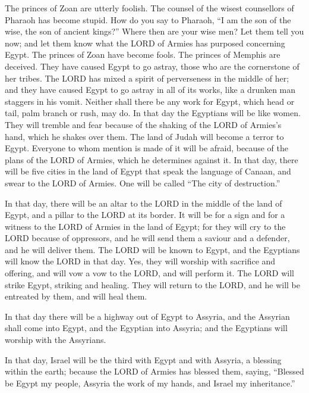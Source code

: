  The princes of Zoan are utterly foolish. The counsel of
the wisest counsellors of Pharaoh has become stupid. How do you say to
Pharaoh, ``I am the son of the wise, the son of ancient kings?''
 Where then are your wise men? Let them tell you now; and
let them know what the LORD of Armies has purposed concerning Egypt.
 The princes of Zoan have become fools. The princes of
Memphis are deceived. They have caused Egypt to go astray, those who are
the cornerstone of her tribes.  The LORD has mixed a spirit
of perverseness in the middle of her; and they have caused Egypt to go
astray in all of its works, like a drunken man staggers in his vomit.
 Neither shall there be any work for Egypt, which head or
tail, palm branch or rush, may do.  In that day the
Egyptians will be like women. They will tremble and fear because of the
shaking of the LORD of Armies's hand, which he shakes over them.
 The land of Judah will become a terror to Egypt. Everyone
to whom mention is made of it will be afraid, because of the plans of
the LORD of Armies, which he determines against it.  In
that day, there will be five cities in the land of Egypt that speak the
language of Canaan, and swear to the LORD of Armies. One will be called
``The city of destruction.''

 In that day, there will be an altar to the LORD in the
middle of the land of Egypt, and a pillar to the LORD at its border.
 It will be for a sign and for a witness to the LORD of
Armies in the land of Egypt; for they will cry to the LORD because of
oppressors, and he will send them a saviour and a defender, and he will
deliver them.  The LORD will be known to Egypt, and the
Egyptians will know the LORD in that day. Yes, they will worship with
sacrifice and offering, and will vow a vow to the LORD, and will perform
it.  The LORD will strike Egypt, striking and healing. They
will return to the LORD, and he will be entreated by them, and will heal
them.

 In that day there will be a highway out of Egypt to
Assyria, and the Assyrian shall come into Egypt, and the Egyptian into
Assyria; and the Egyptians will worship with the Assyrians.

 In that day, Israel will be the third with Egypt and with
Assyria, a blessing within the earth;  because the LORD of
Armies has blessed them, saying, ``Blessed be Egypt my people, Assyria
the work of my hands, and Israel my inheritance.''

